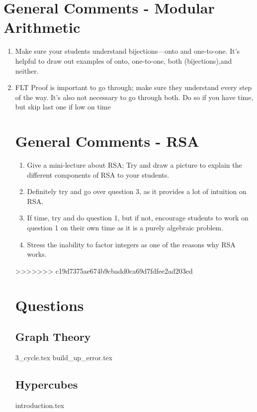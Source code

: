 \documentclass{exam}
\begin{document}
\section{General Comments - Modular Arithmetic}
\begin{enumerate}
\item Make sure your students understand bijections---onto and one-to-one. It's helpful to draw out examples of onto, one-to-one, both (bijections),and neither. 
\item FLT Proof is important to go through; make sure they understand every step of the way. It's also not necessary to go through both. Do so if you have time, but skip last one if low on time

\section{General Comments - RSA}
\begin{enumerate}
\item Give a mini-lecture about RSA; Try and draw a picture to explain the different components of RSA to your students.
\item Definitely try and go over question 3, as it provides a lot of intuition on RSA.
\item If time, try and do question 1, but if not, encourage students to work on question 1 on their own time as it is a purely algebraic problem.
\item Stress the inability to factor integers as one of the reasons why RSA works.
\end{enumerate}


\clearpage 

>>>>>>> c19d7375ae674b9cbadd0ca69d7fdfee2ad203ed
\section{Questions}
\subsection{Graph Theory}
\begin{enumerate}
{3_cycle.tex}
{build_up_error.tex}
\end{enumerate}

\subsection{Hypercubes}
\begin{enumerate}
{introduction.tex}
\end{enumerate}
\end{enumerate}
\end{document}
